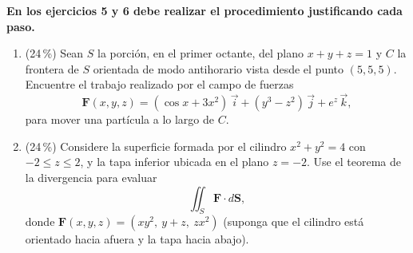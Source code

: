 \documentclass[11pt]{article}
\begin{document}
\vspace{4pt}
\noindent\textbf{En los ejercicios 5 y 6 debe realizar el procedimiento justificando cada paso.}

\begin{enumerate}[start=5]
\item{} (24\,\%) Sean $S$ la porción, en el primer octante, del plano $x + y + z = 1$ y $C$ la frontera de $S$ orientada de modo antihorario vista desde el punto $(5,5,5)$. Encuentre el trabajo realizado por el campo de fuerzas
\[
\mathbf F(x,y,z) = (\cos x + 3x^2)\,\vec i + (y^3 - z^2)\,\vec j + e^z\,\vec k,
\]
para mover una partícula a lo largo de $C$.

\item{} (24\,\%) Considere la superficie formada por el cilindro $x^2 + y^2 = 4$ con $-2 \leq z \leq 2$, y la tapa inferior ubicada en el plano $z = -2$. Use el teorema de la divergencia para evaluar
\[
\iint_S \mathbf F \cdot d\mathbf S,
\]
donde $\mathbf F(x,y,z) = (xy^2,\ y + z,\ zx^2)$ (suponga que el cilindro está orientado hacia afuera y la tapa hacia abajo).
\end{enumerate}

\examfooter
\end{document}
